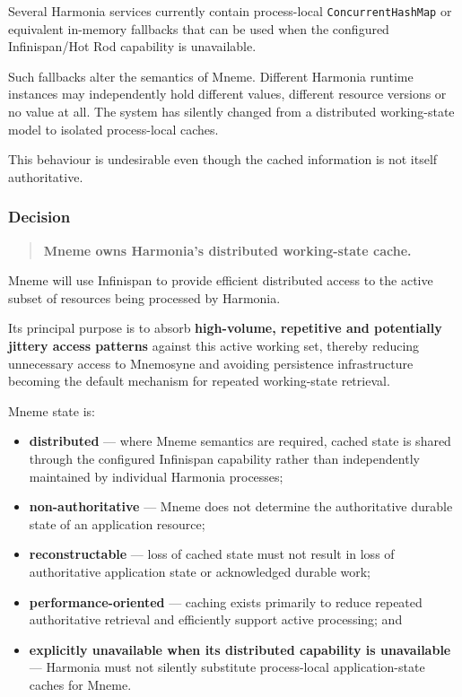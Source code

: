 Several Harmonia services currently contain process-local \texttt{ConcurrentHashMap} or equivalent in-memory fallbacks that can be used when the configured Infinispan/Hot Rod capability is unavailable.

Such fallbacks alter the semantics of Mneme. Different Harmonia runtime instances may independently hold different values, different resource versions or no value at all. The system has silently changed from a distributed working-state model to isolated process-local caches.

This behaviour is undesirable even though the cached information is not itself authoritative.

\subsubsection{Decision}

\begin{quote}
    \textbf{Mneme owns Harmonia's distributed working-state cache.}
\end{quote}

Mneme will use Infinispan to provide efficient distributed access to the active subset of resources being processed by Harmonia.

Its principal purpose is to absorb \textbf{high-volume, repetitive and potentially jittery access patterns} against this active working set, thereby reducing unnecessary access to Mnemosyne and avoiding persistence infrastructure becoming the default mechanism for repeated working-state retrieval.

Mneme state is:
\begin{itemize}
    \item \textbf{distributed} --- where Mneme semantics are required, cached state is shared through the configured Infinispan capability rather than independently maintained by individual Harmonia processes;
    \item \textbf{non-authoritative} --- Mneme does not determine the authoritative durable state of an application resource;
    \item \textbf{reconstructable} --- loss of cached state must not result in loss of authoritative application state or acknowledged durable work;
    \item \textbf{performance-oriented} --- caching exists primarily to reduce repeated authoritative retrieval and efficiently support active processing; and
    \item \textbf{explicitly unavailable when its distributed capability is unavailable} --- Harmonia must not silently substitute process-local application-state caches for Mneme.
\end{itemize}

